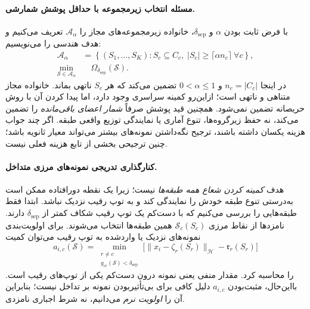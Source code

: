 \paragraph{مسئله انتخاب زیرمجموعه با حداقل پوشش شمارشی.}
با فرض ثابت بودن
$\alpha$ و $\delta_{\mathrm{sep}}$،
خانواده زیرمجموعه‌های مجاز را
$\mathcal A_\alpha$ تعریف
می‌کنیم و هدف هندسی را می‌نویسیم:
\begin{equation}\label{cmp:eq:ch3-outlier-js-subset-problem}
\boxed{
\begin{aligned}
\mathcal A_\alpha
&=\left\{(S_1,\ldots,S_K):
 S_c\subseteq C_c,\;
 |S_c|\ge\lceil\alpha n_c\rceil
 \ \forall c\right\},\\
\min_{\mathscr S\in\mathcal A_\alpha}
&\quad\Omega_{\delta_{\mathrm{sep}}}(\mathscr S).
\end{aligned}}
\end{equation}
در اینجا $n_c=|C_c|$ و
$0<\alpha\le1$ تضمین می‌کند
که هر $S_c$ ناتهی بماند.
خانواده مجاز متناهی و ناتهی
است؛ ازاین‌رو کمینه سراسری
وجود دارد، اما پیدا کردن
آن با روش حریصانه تضمین
نمی‌شود. همچنین قید پوشش
صرفاً \emph{شمار اعضای
باقی‌مانده} را تضمین
می‌کند، نه حفظ زیرگروه‌ها،
تنوع آماری یا نمایندگی
توزیع واقعی طبقه.
اگر چند جواب هزینه یکسان
داشته باشند، ترجیح نگه‌داشتن
نمونه‌های بیشتر می‌تواند
معیار ثانویه باشد؛ چنین
ترجیحی بخشی از تابع هزینه
فعلی نیست.

\paragraph{کنارگذاری تدریجی نمونه‌های مرزی متداخل.}
هدف \emph{کمینه کردن شعاع همه طبقه‌ها}
نیست؛ زیرا یک نقطه دورافتاده
ممکن است به‌درستی تنوع طبقه خودش
را نمایندگی کند و به توپ رقیب
نزدیک نباشد. ابتدا فقط طبقه‌هایی
را بررسی می‌کنیم که با دست‌کم
یک توپ رقیب شکاف کمتر از
$\delta_{\mathrm{sep}}$ دارند.
نامزدها از نقاط مرزی
$\mathcal S_c(S_c)$ همین طبقه‌ها
انتخاب می‌شوند. برای اولویت‌بندی
نمونه‌های نزدیک یا واردشده به
توپ رقیب می‌توان کمیت
\begin{equation}\label{cmp:eq:ch3-outlier-js-rival-intrusion}
a_{i,c}(\mathscr S)=
\min_{\substack{r\ne c\\g_{cr}(\mathscr S)<\delta_{\mathrm{sep}}}}
\bigl[
\|x_i-\zeta_r(S_r)\|_{\mathcal H}
-\mathfrak r_r(S_r)
\bigr]
\end{equation}
را محاسبه کرد.
مقدار منفی یعنی نمونه درون
دست‌کم یکی از توپ‌های رقیب است.
بااین‌حال، مثبت‌بودن $a_{i,c}$
دلیل کافی برای بی‌تأثیربودن
نمونه بر تداخل نیست؛ بنابراین
آن را \emph{اولویت نرم} می‌دانیم،
نه شرط اجباری نامزدی.

